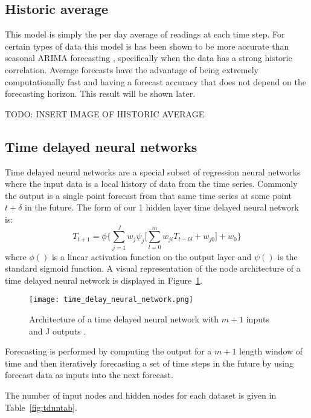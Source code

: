 \subsection{Historic average}
This model is simply the per day average of readings at each time step.  For certain types of data this model is has been shown to be more accurate than seasonal ARIMA forecasting \cite{Newsham2010}, specifically when the data has a strong historic correlation.  Average forecasts have the advantage of being extremely computationally fast and having a forecast accuracy that does not depend on the forecasting horizon.  This result will be shown later.

TODO: INSERT IMAGE OF HISTORIC AVERAGE

\subsection{Time delayed neural networks}

Time delayed neural networks are a special subset of regression neural networks where the input data is a local history of data from the time series.  Commonly the output is a single point forecast from that same time series at some point $t + \delta$ in the future.   The form of our 1 hidden layer time delayed neural network is:
\begin{equation}
T_{t + 1} = \phi \{ \sum_{j = 1}^{J} w_{j}\psi_{j} \bigg[ \sum_{l = 0}^{m}w_{ji}T_{t - l\delta} + w_{j0} \bigg] + w_0 \}
\end{equation}
\noindent where $\phi()$ is a linear activation function on the output layer and $\psi()$ is the standard sigmoid function.  A visual representation of the node architecture of a time delayed neural network is displayed in Figure~\ref{fig:tdnnarch}.

\begin{figure}[h]
	\centering
		\texttt{[image: time\_delay\_neural\_network.png]}
		\caption{Architecture of a time delayed neural network with $m + 1$ inputs and J outputs \cite{Hansen2003}.}
	\label{fig:tdnnarch}
\end{figure}

Forecasting is performed by computing the output for a $m + 1$ length window of time and then iteratively forecasting a set of time steps in the future by using forecast data as inputs into the next forecast. 

The number of input nodes and hidden nodes for each dataset is given in Table~\ref{fig:tdnntab}.

